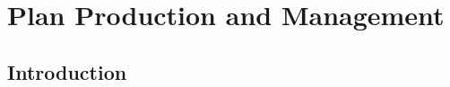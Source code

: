 
\chapter{Plan Production and Management} %

\label{chapter-plan_management} %



\section{Introduction}
\label{sec-plan_management-intro}

